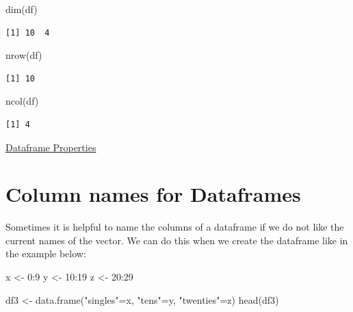 \documentclass[
  letterpaper,
  DIV=11,
  numbers=noendperiod]{scrreprt}
\newenvironment{Shaded}{\begin{snugshade}}{\end{snugshade}}
\newcommand{\DecValTok}[1]{\textcolor[rgb]{0.68,0.00,0.00}{#1}}
\newcommand{\FunctionTok}[1]{\textcolor[rgb]{0.28,0.35,0.67}{#1}}
\newcommand{\NormalTok}[1]{\textcolor[rgb]{0.00,0.23,0.31}{#1}}
\newcommand{\OtherTok}[1]{\textcolor[rgb]{0.00,0.23,0.31}{#1}}
\newcommand{\SpecialCharTok}[1]{\textcolor[rgb]{0.37,0.37,0.37}{#1}}
\newcommand{\StringTok}[1]{\textcolor[rgb]{0.13,0.47,0.30}{#1}}
\begin{document}
\begin{Shaded}
\begin{Highlighting}[]
\FunctionTok{dim}\NormalTok{(df)}
\end{Highlighting}
\end{Shaded}

\begin{verbatim}
[1] 10  4
\end{verbatim}

\begin{Shaded}
\begin{Highlighting}[]
\FunctionTok{nrow}\NormalTok{(df)}
\end{Highlighting}
\end{Shaded}

\begin{verbatim}
[1] 10
\end{verbatim}

\begin{Shaded}
\begin{Highlighting}[]
\FunctionTok{ncol}\NormalTok{(df)}
\end{Highlighting}
\end{Shaded}

\begin{verbatim}
[1] 4
\end{verbatim}

\begin{watch}{}{}
    \href{https://youtu.be/fYxmRUeK4qw}{Dataframe Properties}
\end{watch}

\section{Column names for Dataframes}\label{column-names-for-dataframes}

Sometimes it is helpful to name the columns of a dataframe if we do not
like the current names of the vector. We can do this when we create the
dataframe like in the example below:

\begin{Shaded}
\begin{Highlighting}[]
\NormalTok{x }\OtherTok{\textless{}{-}} \DecValTok{0}\SpecialCharTok{:}\DecValTok{9}
\NormalTok{y }\OtherTok{\textless{}{-}} \DecValTok{10}\SpecialCharTok{:}\DecValTok{19}
\NormalTok{z }\OtherTok{\textless{}{-}} \DecValTok{20}\SpecialCharTok{:}\DecValTok{29}

\NormalTok{df3 }\OtherTok{\textless{}{-}} \FunctionTok{data.frame}\NormalTok{(}\StringTok{"singles"}\OtherTok{=}\NormalTok{x, }\StringTok{"tens"}\OtherTok{=}\NormalTok{y, }\StringTok{"twenties"}\OtherTok{=}\NormalTok{z)}
\FunctionTok{head}\NormalTok{(df3)}
\end{Highlighting}
\end{Shaded}
\end{document}
